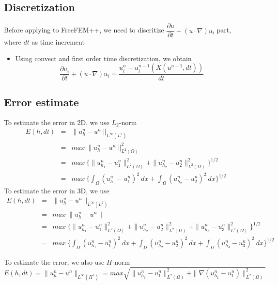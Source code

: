 \documentclass[a4paper,10pt]{article}
\begin{document}
\subsection{Discretization}
Before applying to FreeFEM++, we need to discritize $ \dfrac{\partial u}{\partial t} + (u \cdot \nabla)u_{i} $ part, where $ dt $ as time increment
\begin{itemize}
	\item Using convect and first order time discretization, we obtain
	\[ \dfrac{\partial u_{i}}{\partial t} + (u \cdot \nabla)u_{i} = \dfrac{u_{i}^{n} - u_{i}^{n-1}(X(u^{n-1},dt))}{dt}\]
\end{itemize}



\subsection{Error estimate}
To estimate the error in 2D, we use $ L_{2} $-norm
\begin{eqnarray}\nonumber
E(h,dt) &=& \| u_{h}^{n}-u^{n} \|_{L^\infty(L^2)} \\ \nonumber
&=& max \ \| u_{h}^{n}-u^{n} \|_{L^2(\Omega)}^{2} \\ \nonumber
&=& max \ \{ \| u_{h_{1}}^{n}-u_{1}^{n} \|_{L^2(\Omega)}^{2} + \| u_{h_{2}}^{n}-u_{2}^{n} \|_{L^2(\Omega)}^{2} \}^{1/2} \\ \nonumber
&=& max \ \{ \int_{\Omega} (u_{h_{1}}^{n}-u_{1}^{n})^2 \ dx + \int_{\Omega} (u_{h_{2}}^{n}-u_{2}^{n})^2 \ dx \}^{1/2}
\end{eqnarray}
To estimate the error in 3D, we use
\begin{eqnarray}\nonumber
E(h,dt) &=& \| u_{h}^{n}-u^{n} \|_{L^\infty(L^2)} \\ \nonumber
&=& max \ \| u_{h}^{n}-u^{n} \| \\ \nonumber
&=& max \ \{ \| u_{h_{1}}^{n}-u_{1}^{n} \|_{L^2(\Omega)}^{2} + \| u_{h_{2}}^{n}-u_{2}^{n} \|_{L^2(\Omega)}^{2} + \| u_{h_{3}}^{n}-u_{3}^{n} \|_{L^2(\Omega)}^{2} \}^{1/2} \\ \nonumber
&=& max \ \{ \int_{\Omega} (u_{h_{1}}^{n}-u_{1}^{n})^2 \ dx + \int_{\Omega} (u_{h_{2}}^{n}-u_{2}^{n})^2 \ dx +  \int_{\Omega} (u_{h_{3}}^{n}-u_{3}^{n})^2 \ dx \}^{1/2}
\end{eqnarray}

To estimate the error, we also use $ H $-norm
\[ E(h,dt) = \| u_{h}^{n}-u^{n} \|_{L^\infty(H^{1})} = max \sqrt{\| u_{h_{1}}^{n}-u_{1}^{n} \|_{L^2(\Omega)}^{2} + \| \nabla (u_{h_{1}}^{n}-u_{1}^{n}) \|_{L^2(\Omega)}^{2}} \]
\end{document}
